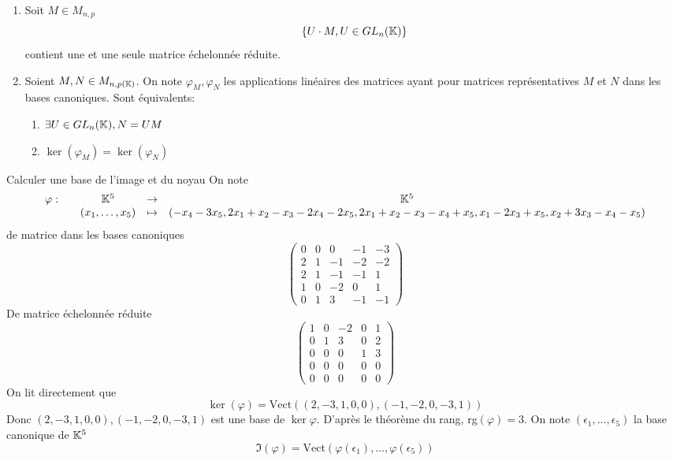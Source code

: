 \documentclass[]{report}
\begin{document}
\begin{tm}{}{}
    \begin{enumerate}
        \item Soit $M\in M_{n,p}$
        \[\left\{ U\cdot M,U\in GL_n(\mathbb{K})\right\}\]
        contient une et une seule matrice échelonnée réduite.
        \item Soient $M,N\in M_{n,p(\mathbb{K})}$. On note $\varphi_M,\varphi_N$ les applications linéaires des matrices ayant pour matrices représentatives $M$ et $N$ dans les bases canoniques. Sont équivalents:
        \begin{enumerate}
            \item $\exists U\in GL_n(\mathbb{K}),N=UM$
            \item $\ker(\varphi_M)=\ker (\varphi_N)$
        \end{enumerate}
    \end{enumerate}
\end{tm}

\begin{ex}{Calculer une base de l'image et du noyau}{}
    On note
    \[\begin{array}{ccccc} \varphi : & & \mathbb{K}^5 & \to & \mathbb{K}^5 \\ & & (x_1,\ldots,x_5) & \mapsto & (-x_4-3x_5,2x_1+x_2-x_3-2x_4-2x_5,2x_1+x_2-x_3-x_4+x_5,x_1-2x_3+x_5,x_2+3x_3-x_4-x_5) \end{array}\]
    de matrice dans les bases canoniques
    \[\left(\begin{matrix}
        0&0&0&-1&-3 \\
        2&1&-1&-2&-2 \\
        2&1&-1&-1&1 \\
        1&0&-2&0&1 \\
        0&1&3&-1&-1
    \end{matrix}\right)\]
    De matrice échelonnée réduite
    \[\left(\begin{matrix}
        1&0&-2&0&1\\
        0&1&3&0&2\\
        0&0&0&1&3\\
        0&0&0&0&0\\
        0&0&0&0&0
    \end{matrix}\right)\]
    On lit directement que
    \[\ker (\varphi)= \text{Vect}\left((2,-3,1,0,0),(-1,-2,0,-3,1)\right)\]
    Donc $(2,-3,1,0,0),(-1,-2,0,-3,1)$ est une base de $\ker \varphi$. D'après le théorème du rang, rg$(\varphi)=3$. On note $(\epsilon_1,\ldots,\epsilon_5)$ la base canonique de $\mathbb{K}^5$
    \[\Im(\varphi)=\text{Vect} (\varphi(\epsilon_1),\ldots,\varphi(\epsilon_5))\]
\end{ex}
\end{document}
